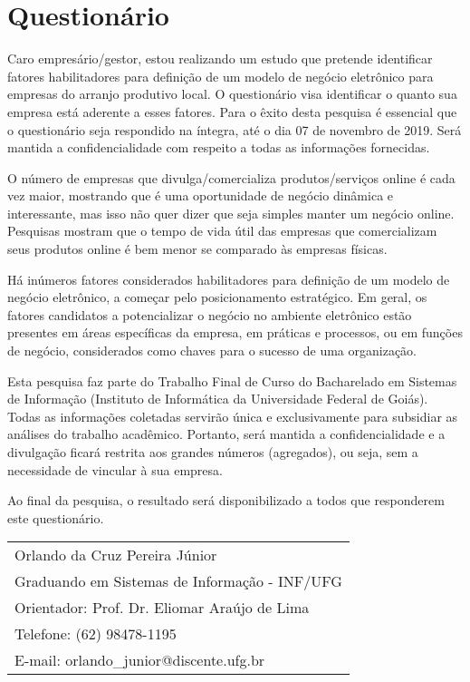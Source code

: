 \chapter{Questionário}
\label{apend:2}

Caro empresário/gestor, estou realizando um estudo que pretende identificar fatores habilitadores para definição de um modelo de negócio eletrônico para empresas do arranjo produtivo local. O questionário visa identificar o quanto sua empresa está aderente a esses fatores. Para o êxito desta pesquisa é essencial que o questionário seja respondido na íntegra, até o dia 07 de novembro de 2019. Será mantida a confidencialidade com respeito a todas as informações fornecidas.

O número de empresas que divulga/comercializa produtos/serviços online é cada vez maior, mostrando que é uma oportunidade de negócio dinâmica e interessante, mas isso não quer dizer que seja simples manter um negócio online. Pesquisas mostram que o tempo de vida útil das empresas que comercializam seus produtos online é bem menor se comparado às empresas físicas.

Há inúmeros fatores considerados habilitadores para definição de um modelo de negócio eletrônico, a começar pelo posicionamento estratégico. Em geral, os fatores candidatos a potencializar o negócio no ambiente eletrônico estão presentes em áreas específicas da empresa, em práticas e processos, ou em funções de negócio, considerados como chaves para o sucesso de uma organização.

Esta pesquisa faz parte do Trabalho Final de Curso do Bacharelado em Sistemas de Informação (Instituto de Informática da Universidade Federal de Goiás). Todas as informações coletadas servirão única e exclusivamente para subsidiar as análises do trabalho acadêmico. Portanto, será mantida a confidencialidade e a divulgação ficará restrita aos grandes números (agregados), ou seja, sem a necessidade de vincular à sua empresa.

Ao final da pesquisa, o resultado será disponibilizado a todos que responderem este questionário.

\begin{table}[]
\begin{tabular}{l}
Orlando da Cruz Pereira Júnior \\
Graduando em Sistemas de Informação - INF/UFG \\
Orientador: Prof. Dr. Eliomar Araújo de Lima \\
Telefone: (62) 98478-1195 \\
E-mail: orlando\_junior@discente.ufg.br
\end{tabular}
\end{table}

